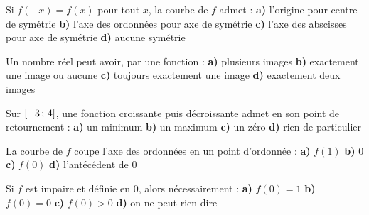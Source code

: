 \begin{qcm}
\exo Si $f(-x) = f(x)$ pour tout $x$, la courbe de $f$ admet :
\textbf{a)} l'origine pour centre de symétrie \quad
\textbf{b)} l'axe des ordonnées pour axe de symétrie \quad
\textbf{c)} l'axe des abscisses pour axe de symétrie \quad
\textbf{d)} aucune symétrie 

\exo Un nombre réel peut avoir, par une fonction :
\textbf{a)} plusieurs images \quad \textbf{b)} exactement une image ou
aucune \quad \textbf{c)} toujours exactement une image \quad
\textbf{d)} exactement deux images 

\exo Sur $\left[-3\,;\,4\right]$, une fonction croissante puis décroissante
admet en son point de retournement :
\textbf{a)} un minimum \quad \textbf{b)} un maximum \quad
\textbf{c)} un zéro \quad \textbf{d)} rien de particulier 

\exo La courbe de $f$ coupe l'axe des ordonnées en un point d'ordonnée :
\textbf{a)} $f(1)$ \quad \textbf{b)} $0$ \quad \textbf{c)} $f(0)$ \quad
\textbf{d)} l'antécédent de $0$ 

\exo Si $f$ est impaire et définie en $0$, alors nécessairement :
\textbf{a)} $f(0) = 1$ \quad \textbf{b)} $f(0) = 0$ \quad
\textbf{c)} $f(0) > 0$ \quad \textbf{d)} on ne peut rien dire
\end{qcm}


